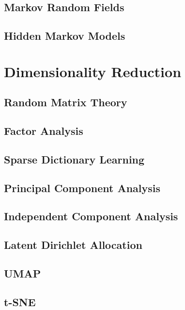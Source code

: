 \documentclass{article}
\begin{document}
  \subsection{Markov Random Fields}

  \subsection{Hidden Markov Models}

\section{Dimensionality Reduction} 

  \subsection{Random Matrix Theory} 

  \subsection{Factor Analysis}

  \subsection{Sparse Dictionary Learning}

  \subsection{Principal Component Analysis} 

  \subsection{Independent Component Analysis} 

  \subsection{Latent Dirichlet Allocation} 

  \subsection{UMAP}

  \subsection{t-SNE}
\end{document}
